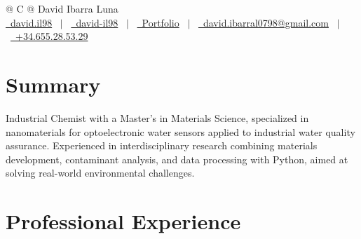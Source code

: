 \documentclass[a4paper,12pt]{article}
\begin{document}
\pagestyle{empty} 



\begin{tabularx}{\linewidth}{@{} C @{}}
\Huge{David Ibarra Luna} \\[7.5pt]
\href{https://github.com/davidil98}{\raisebox{-0.05\height}\faGithub\ david.il98} \ $|$ \ 
\href{https://www.linkedin.com/in/david-il98}{\raisebox{-0.05\height}\faLinkedin\ david-il98} \ $|$ \ 
\href{https://david-ibarra-portafolio.onrender.com/}{\raisebox{-0.05\height}\faGlobe \ Portfolio} \ $|$ \ 
\href{mailto:david.ibarral0798@gmail.com}{\raisebox{-0.05\height}\faEnvelope \ david.ibarral0798@gmail.com} \ $|$ \ 
\href{tel:+34675105523}{\raisebox{-0.05\height}\faMobile \ +34.655.28.53.29} \\
\end{tabularx}


\section{Summary}
Industrial Chemist with a Master's in Materials Science, specialized in nanomaterials for optoelectronic water sensors applied to industrial water quality assurance. Experienced in interdisciplinary research combining materials development, contaminant analysis, and data processing with Python, aimed at solving real-world environmental challenges.

\section{Professional Experience}
\end{document}

